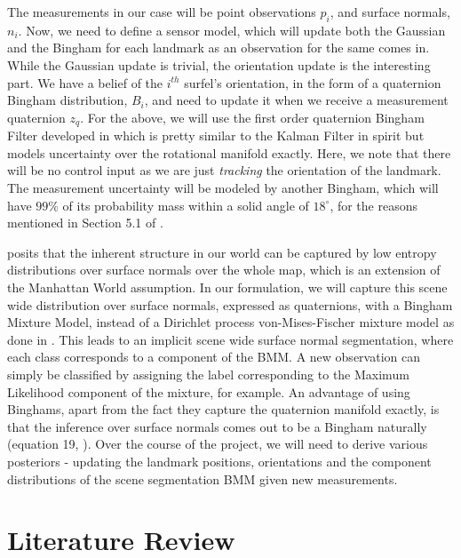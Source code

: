 \documentclass[12pt]{article}
\begin{document}
\vspace{1em}

The measurements in our case will be point observations $p_i$, and surface normals, $n_i$. 
Now, we need to define a sensor model, which will update both the Gaussian and the Bingham for each landmark as an observation for the same comes in. 
While the Gaussian update is trivial, the orientation update is the interesting part. 
We have a belief of the $i^{th}$ surfel's orientation, in the form of a quaternion Bingham distribution, $B_i$, and need to update it when we receive a measurement quaternion $z_q$. 
For the above, we will use the first order quaternion Bingham Filter developed in \cite{glover} which is pretty similar to the Kalman Filter in spirit but models uncertainty over the rotational manifold exactly.
Here, we note that there will be no control input as we are just \textit{tracking} the orientation of the landmark.
The measurement uncertainty will be modeled by another Bingham, which will have $99\%$ of its probability mass within a solid angle of $18^{\circ}$, for the reasons mentioned in Section 5.1 of \cite{straub}.

\vspace{1em}

\cite{straub} posits that the inherent structure in our world can be captured by low entropy distributions over surface normals over the whole map, which is an extension of the Manhattan World assumption.
In our formulation, we will capture this scene wide distribution over surface normals, expressed as quaternions, with a Bingham Mixture Model, instead of a Dirichlet process von-Mises-Fischer mixture model as done in \cite{straub}.
This leads to an implicit scene wide surface normal segmentation, where each class corresponds to a component of the BMM. 
A new observation can simply be classified by assigning the label corresponding to the Maximum Likelihood component of the mixture, for example.  
An advantage of using Binghams, apart from the fact they capture the quaternion manifold exactly, is that the inference over surface normals comes out to be a Bingham naturally (equation 19, \cite{straub}). 
Over the course of the project, we will need to derive various posteriors - updating the landmark positions, orientations and the component distributions of the scene segmentation BMM given new measurements. 

\section{Literature Review}
\end{document}
